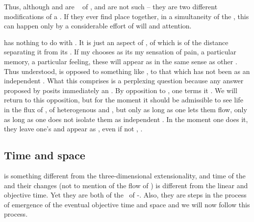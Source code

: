 Thus, although  and  are \equi\  
of ,  and 
 are not such  -- they are two 
different modifications of a . If they ever find 
place together, in a simultaneity of the \hoa, this can happen only by 
a considerable effort of will and attention.



\pa
{} has nothing to do with . It is just an 
aspect of , of  
which is  of the distance separating it from its . If 
my  chooses as its  my sensation of pain, a 
particular memory, a particular feeling, these will appear as 
 in the same sense as other . Thus 
understood,  is opposed to something like , 
to that which has not been  as an independent . What
this  comprises is a perplexing question because any answer
proposed by  posits immediately an .
By opposition to , one terms it . We will
return to this opposition, but for the moment it should be admissible to see
 life in the flux of , of heterogenous 
 and , but only as long as one lets 
them flow, only as long as one does not isolate them as independent . 
In the moment one does it, they leave one's  and appear as 
, even if not , .

\subsection{Time and space}\label{sub:timeSpace}
%
 is something different from the 
three-dimensional {extensionality}, and time of the  and their
changes (not to mention  of the flow of
) is different from the linear and objective time. Yet they are
both  of the \nexus\ of -. Also,
they are steps in the process of emergence of the eventual objective time and space
and we will now follow this process. 

